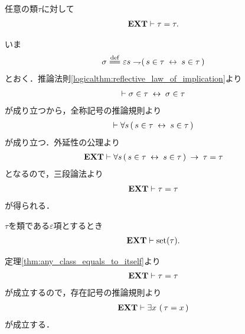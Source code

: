 	\begin{screen}
		\begin{thm}[任意の類は自分自身と等しい]\label{thm:any_class_equals_to_itself}
			任意の類$\tau$に対して
			\begin{align}
				\mbox{{\bf EXT}} \vdash \tau = \tau.
			\end{align}
		\end{thm}
	\end{screen}
	
	\begin{sketch}
		いま
		\begin{align}
			\sigma \defeq 
			\varepsilon s \negation (\, s \in \tau \lrarrow s \in \tau\, )
		\end{align}
		とおく．推論法則\ref{logicalthm:reflective_law_of_implication}より
		\begin{align}
			\vdash \sigma \in \tau \hspace{0.25em}\leftrightarrow\hspace{0.25em} \sigma \in \tau
		\end{align}
		が成り立つから，全称記号の推論規則より
		\begin{align}
			\vdash \forall s\, (\, s \in \tau  \hspace{0.25em}\leftrightarrow\hspace{0.25em} s \in \tau\, )
		\end{align}
		が成り立つ．外延性の公理より
		\begin{align}
			\mbox{{\bf EXT}} \vdash \forall s\, (\, s \in \tau  \hspace{0.25em}\leftrightarrow\hspace{0.25em} s \in \tau\, )
			\hspace{0.25em}\rightarrow\hspace{0.25em} \tau = \tau
		\end{align}
		となるので，三段論法より
		\begin{align}
			\mbox{{\bf EXT}} \vdash \tau = \tau
		\end{align}
		が得られる．
		\QED
	\end{sketch}
	
	\begin{screen}
		\begin{thm}
		\label{thm:critical_epsilon_term_is_set}
			$\tau$を類である$\varepsilon$項とするとき
			\begin{align}
				\mbox{{\bf EXT}} \vdash \operatorname*{set} (\tau).
			\end{align}
		\end{thm}
	\end{screen}
	
	\begin{sketch}
		定理\ref{thm:any_class_equals_to_itself}より
		\begin{align}
			\mbox{{\bf EXT}} \vdash \tau = \tau
		\end{align}
		が成立するので，存在記号の推論規則より
		\begin{align}
			\mbox{{\bf EXT}} \vdash \exists x\, \left(\, \tau = x\, \right)
		\end{align}
		が成立する．
		\QED
	\end{sketch}
	

